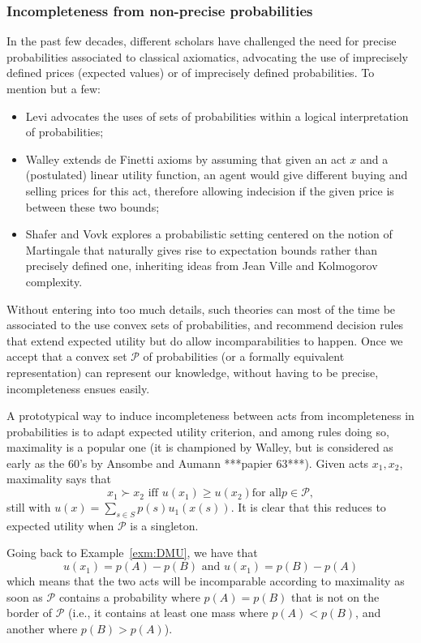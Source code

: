 \documentclass[french, english]{llncs}
\begin{document}
	\subsubsection{Incompleteness from non-precise probabilities}
	
	In the past few decades, different scholars have challenged the need for precise probabilities associated to classical axiomatics, advocating the use of imprecisely defined prices (expected values) or of imprecisely defined probabilities. To mention but a few:
	\begin{itemize} 
		\item Levi advocates the uses of sets of probabilities within a logical interpretation of probabilities;
		\item Walley extends de Finetti axioms by assuming that given an act $x$ and a (postulated) linear utility function, an agent would give different buying and selling prices for this act, therefore allowing indecision if the given price is between these two bounds;
		\item Shafer and Vovk explores a probabilistic setting centered on the notion of Martingale that naturally gives rise to expectation bounds rather than precisely defined one, inheriting ideas from Jean Ville and Kolmogorov complexity. 
	\end{itemize}
	Without entering into too much details, such theories can most of the time be associated to the use convex sets of probabilities, and recommend decision rules that extend expected utility but do allow incomparabilities to happen. Once we accept that a convex set $\mathcal{P}$ of probabilities (or a formally equivalent representation) can represent our knowledge, without having to be precise, incompleteness ensues easily. 
	
	A prototypical way to induce incompleteness between acts from incompleteness in probabilities is to adapt expected utility criterion, and among rules doing so, maximality is a popular one (it is championed by Walley, but is considered as early as the 60's by Ansombe and Aumann ***papier 63***). Given acts $x_1,x_2$, maximality says that 
	$$x_1 \succ x_2 \textrm{ iff }  u(x_1) ≥ u(x_2) \textrm{for all} p \in \mathcal{P},$$
	still with $u(x) = \sum_{s \in S} p(s) u_1(x(s))$. It is clear that this reduces to expected utility when $\mathcal{P}$	is a singleton. 
	
	\begin{example}
		Going back to Example~\ref{exm:DMU}, we have that 
		$$u(x_1)=p(A) - p(B) \textrm{ and } u(x_1)=p(B) - p(A)$$
		which means that the two acts will be incomparable according to maximality as soon as $\mathcal{P}$ contains a probability where $p(A)=p(B)$ that is not on the border of $\mathcal{P}$ (i.e., it contains at least one mass where $p(A)<p(B)$, and another where $p(B)>p(A)$). 
	\end{example}
	
\end{document}

